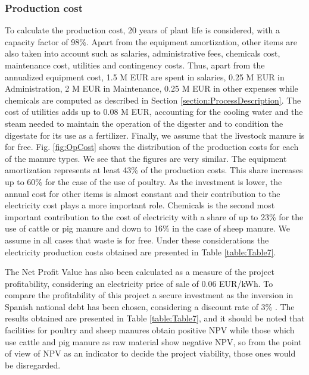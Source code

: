 \begin{refsection}[referencesCh2]
\subsubsection{Production cost}
To calculate the production cost, 20 years of plant life is considered, with a capacity factor of 98\%. Apart from the equipment amortization, other items are also taken into account such as salaries, administrative fees, chemicals cost, maintenance cost, utilities and contingency costs. Thus, apart from the annualized equipment cost, 1.5 M EUR are spent in salaries, 0.25 M EUR in Administration, 2 M EUR in Maintenance, 0.25 M EUR in other expenses \citep{Leon} while chemicals are computed as described in Section \ref{section:ProcessDescription}. The cost of utilities adds up to 0.08 M EUR, accounting for the cooling water and the steam needed to maintain the operation of the digester and to condition the digestate for its use as a fertilizer. Finally, we assume that the livestock manure is for free. Fig. \ref{fig:OpCost} shows the distribution of the production costs for each of the manure types. We see that the figures are very similar. The equipment amortization represents at least 43\% of the production costs. This share increases up to 60\% for the case of the use of poultry. As the investment is lower, the annual cost for other items is almost constant and their contribution to the electricity cost plays a more important role. Chemicals is the second most important contribution to the cost of electricity with a share of up to 23\% for the use of cattle or pig manure and down to 16\% in the case of sheep manure. We assume in all cases that waste is for free. Under these considerations the electricity production costs obtained are presented in Table \ref{table:Table7}.

The Net Profit Value has also been calculated as a measure of the project profitability, considering an electricity price of sale of 0.06 EUR/kWh. To compare the profitability of this project a secure investment as the inversion in Spanish national debt has been chosen, considering a discount rate of 3\% \citep{TesoroSpain}. The results obtained are presented in Table \ref{table:Table7}, and it should be noted that facilities for poultry and sheep manures obtain positive NPV while those which use cattle and pig manure as raw material show negative NPV, so from the point of view of NPV as an indicator to decide the project viability, those ones would be disregarded.




\end{refsection}
